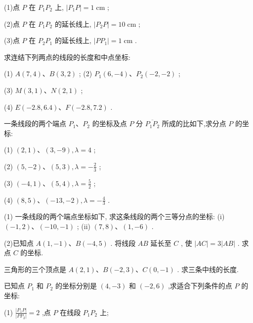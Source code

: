 \documentclass[lang=cn,newtx,10.5pt,scheme=chinese]{elegantbook}
\begin{document}
\begin{problemset}[习 题 一]
(1)点 \(P\) 在 \({P}_{1}{P}_{2}\) 上, \(\left| {{P}_{1}P}\right| = 1\mathrm{\;{cm}}\) ;

(2)点 \(P\) 在 \({P}_{1}{P}_{2}\) 的延长线上, \(\left| {{P}_{2}P}\right| = {10}\mathrm{\;{cm}}\) ;

(3)点 \(P\) 在 \({P}_{2}{P}_{1}\) 的延长线上, \(\left| {P{P}_{1}}\right| = 1\mathrm{\;{cm}}\) .

\item 求连结下列两点的线段的长度和中点坐标:

(1) \(A\left( {7,4}\right) \text{、}B\left( {3,2}\right)\) ; (2) \({P}_{1}\left( {6, - 4}\right) \text{、}{P}_{2}\left( {-2, - 2}\right)\) ;

(3) \(M\left( {3,1}\right) \text{、}N\left( {2,1}\right)\) ;

(4) \(E\left( {-{2.8},{6.4}}\right) \text{、}F\left( {-{2.8},{7.2}}\right)\) .

\item 一条线段的两个端点 \({P}_{1}\text{、}{P}_{2}\) 的坐标及点 \(P\) 分 \(\overline{{P}_{1}{P}_{2}}\) 所成的比如下,求分点 \(P\) 的坐标:

(1) \(\left( {2,1}\right) \text{、}\left( {3, - 9}\right) ,\lambda = 4\) ;

(2) \(\left( {5, - 2}\right) \text{、}\left( {5,3}\right) ,\lambda = - \frac{2}{3}\) ;

(3) \(\left( {-4,1}\right) \text{、}\left( {5,4}\right) ,\lambda = \frac{5}{2}\) ;

(4) \(\left( {8,5}\right) \text{、}\left( {-{13}, - 2}\right) ,\lambda = - \frac{4}{3}\) .

\item (1) 一条线段的两个端点坐标如下, 求这条线段的两个三等分点的坐标: (i) \(\left( {-1,2}\right) \text{、}\left( {-{10}, - 1}\right)\) ; (ii) \(\left( {7,8}\right) \text{、}\left( {1, - 6}\right)\) .

(2)已知点 \(A\left( {1, - 1}\right) \text{、}B\left( {-4,5}\right)\) . 将线段 \({AB}\) 延长至 \(C\) , 使 \(\left| {AC}\right| = 3\left| {AB}\right|\) . 求点 \(C\) 的坐标.

\item 三角形的三个顶点是 \(A\left( {2,1}\right) \text{、}B\left( {-2,3}\right) \text{、}C\left( {0, - 1}\right)\) . 求三条中线的长度.

\item 已知点 \({P}_{1}\) 和 \({P}_{2}\) 的坐标分别是 \(\left( {4, - 3}\right)\) 和 \(\left( {-2,6}\right)\) ,求适合下列条件的点 \(P\) 的坐标:

(1) \(\frac{\left| {P}_{1}P\right| }{\left| P{P}_{2}\right| } = 2\) ,点 \(P\) 在线段 \({P}_{1}{P}_{2}\) 上;


\end{problemset}
\end{document}
